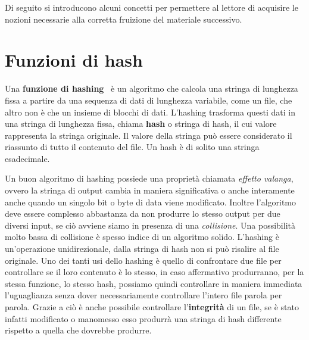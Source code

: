 Di seguito si introducono alcuni concetti 
per permettere al lettore di acquisire le nozioni necessarie alla
corretta fruizione del materiale successivo.

\section{Funzioni di hash}
\label{sub:hash}
Una \textbf{funzione di hashing}~\cite{hash} è un algoritmo che calcola una stringa di lunghezza
fissa a partire da una sequenza di dati di lunghezza variabile, come un file,
che altro non è che un insieme di blocchi di dati.
L’hashing trasforma questi dati in una stringa di lunghezza fissa, chiama \textbf{hash} o stringa di hash,
il cui valore rappresenta la stringa originale. Il valore della stringa può essere considerato
il riassunto di tutto il contenuto del file. Un hash è di solito una stringa esadecimale.

Un buon algoritmo di hashing possiede una proprietà chiamata \emph{effetto valanga},
ovvero la stringa di output cambia in maniera significativa o anche interamente anche
quando un singolo bit o byte di data viene modificato. Inoltre l’algoritmo deve essere
complesso abbastanza da non produrre lo stesso output per due diversi input, se ciò avviene
siamo in presenza di una \emph{collisione}. Una possibilità molto bassa di collisione è spesso
indice di un algoritmo solido. L’hashing è un’operazione unidirezionale, dalla stringa di hash
non si può risalire al file originale.
Uno dei tanti usi dello hashing è quello di confrontare due file per controllare se il loro contenuto
è lo stesso, in caso affermativo produrranno, per la stessa funzione, lo stesso hash,
possiamo quindi controllare in maniera immediata l’uguaglianza senza dover necessariamente
controllare l’intero file parola per parola.
Grazie a ciò è anche possibile controllare l’\textbf{integrità} di un file, se è stato infatti
modificato o manomesso esso produrrà una stringa di hash differente rispetto a quella che dovrebbe produrre.

